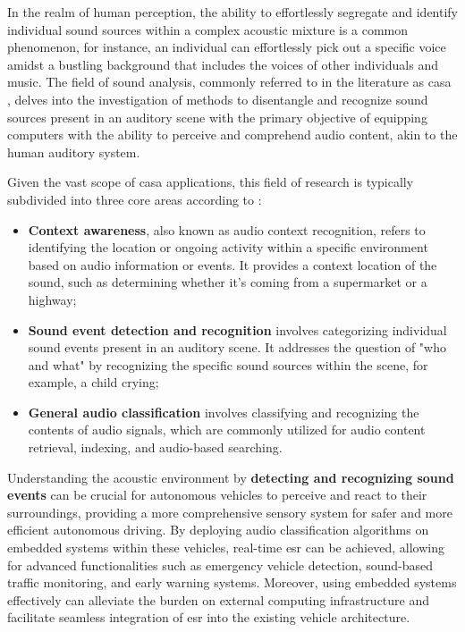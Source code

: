 In the realm of human perception, the ability to effortlessly segregate and identify individual sound sources within a complex acoustic mixture is a common phenomenon, for instance, an individual can effortlessly pick out a specific voice amidst a bustling background that includes the voices of other individuals and music. The field of sound analysis, commonly referred to in the literature as \gls{casa} \cite{Hermes2023}, delves into the investigation of methods to disentangle and recognize sound sources present in an auditory scene with the primary objective of equipping computers with the ability to perceive and comprehend audio content, akin to the human auditory system. 

Given the vast scope of \gls{casa} applications, this field of research is typically subdivided into three core areas according to \textcite{Wang2006}:

\begin{itemize}
    \item \textbf{Context awareness}, also known as audio context recognition, refers to identifying the location or ongoing activity within a specific environment based on audio information or events. It provides a context location of the sound, such as determining whether it's coming from a supermarket or a highway;
    \item \textbf{Sound event detection and recognition} involves categorizing individual sound events present in an auditory scene. It addresses the question of "who and what" by recognizing the specific sound sources within the scene, for example, a child crying;
    \item \textbf{General audio classification} involves classifying and recognizing the contents of audio signals, which are commonly utilized for audio content retrieval, indexing, and audio-based searching.  
\end{itemize}

Understanding the acoustic environment by \textbf{detecting and recognizing sound events} can be crucial for autonomous vehicles to perceive and react to their surroundings, providing a more comprehensive sensory system for safer and more efficient autonomous driving. By deploying audio classification algorithms on embedded systems within these vehicles, real-time \gls{esr} can be achieved, allowing for advanced functionalities such as emergency vehicle detection, sound-based traffic monitoring, and early warning systems. Moreover, using embedded systems effectively can alleviate the burden on external computing infrastructure and facilitate seamless integration of \gls{esr} into the existing vehicle architecture.


